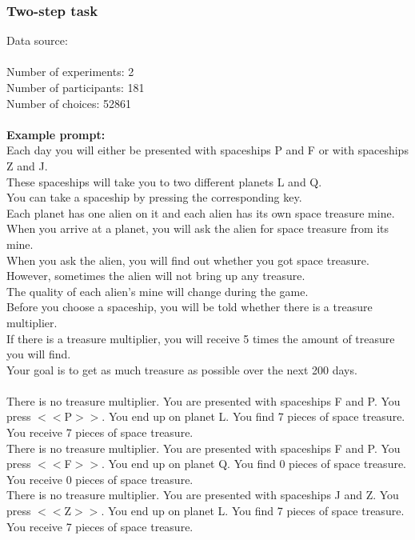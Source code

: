 \documentclass[pdflatex,sn-nature]{sn-jnl}%
\theoremstyle{thmstyleone}%
\theoremstyle{thmstyletwo}%
\theoremstyle{thmstylethree}%
\begin{document}
\subsubsection*{Two-step task}
Data source: \cite{kool2016does} \\ $~$ \\
Number of experiments: 2 $~$\\ 
Number of participants: 181 $~$\\ 
Number of choices: 52861 $~$\\ 
 $~$\\ 
\textbf{Example prompt:}
 $~$\\ 
Each day you will either be presented with spaceships P and F or with spaceships Z and J. $~$\\ 
These spaceships will take you to two different planets L and Q. $~$\\ 
You can take a spaceship by pressing the corresponding key. $~$\\ 
Each planet has one alien on it and each alien has its own space treasure mine. $~$\\ 
When you arrive at a planet, you will ask the alien for space treasure from its mine. $~$\\ 
When you ask the alien, you will find out whether you got space treasure. $~$\\ 
However, sometimes the alien will not bring up any treasure. $~$\\ 
The quality of each alien's mine will change during the game. $~$\\ 
Before you choose a spaceship, you will be told whether there is a treasure multiplier. $~$\\ 
If there is a treasure multiplier, you will receive 5 times the amount of treasure you will find. $~$\\ 
Your goal is to get as much treasure as possible over the next 200 days. $~$\\ 
 $~$\\ 
There is no treasure multiplier. You are presented with spaceships F and P. You press $<<$P$>>$. You end up on planet L. You find 7 pieces of space treasure. You receive 7 pieces of space treasure. $~$\\ 
There is no treasure multiplier. You are presented with spaceships F and P. You press $<<$F$>>$. You end up on planet Q. You find 0 pieces of space treasure. You receive 0 pieces of space treasure. $~$\\ 
There is no treasure multiplier. You are presented with spaceships J and Z. You press $<<$Z$>>$. You end up on planet L. You find 7 pieces of space treasure. You receive 7 pieces of space treasure. $~$\\ 
\end{document}
